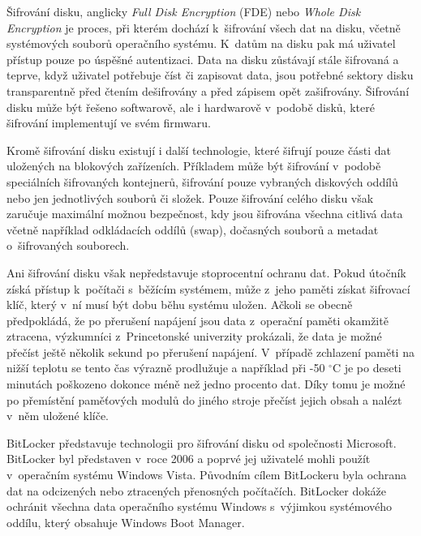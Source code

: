 
\label{sec:fde}

Šifrování disku, anglicky \emph{Full Disk Encryption} (FDE) nebo \emph{Whole Disk Encryption} je proces, při kterém dochází k~šifrování všech dat na disku, včetně systémových souborů operačního systému. K~datům na disku pak má uživatel přístup pouze po úspěšné autentizaci. Data na disku zůstávají stále šifrovaná a teprve, když uživatel potřebuje číst či zapisovat data, jsou potřebné sektory disku transparentně před čtením dešifrovány a před zápisem opět zašifrovány. Šifrování disku může být řešeno softwarově, ale i hardwarově v~podobě disků, které šifrování implementují ve svém firmwaru.\cite{Scarfone2007}

Kromě šifrování disku existují i další technologie, které šifrují pouze části dat ulo\-že\-ných na blokových zařízeních. Příkladem může být šifrování v~podobě speciálních šifrovaných kontejnerů, šifrování pouze vybraných diskových oddílů nebo jen je\-dno\-tli\-vých souborů či složek. Pouze šifrování celého disku však zaručuje maximální možnou bez\-peč\-nost, kdy jsou šifrována všechna citlivá data včetně například odkládacích oddílů (swap), dočasných souborů a metadat o~ši\-fro\-va\-ných souborech.\cite{Scarfone2007}

Ani šifrování disku však nepředstavuje stoprocentní ochranu dat. Pokud útočník získá přístup k~počítači s~běžícím systémem, může z~jeho paměti získat šifrovací klíč, který v~ní musí být dobu běhu systému uložen. Ačkoli se obecně předpokládá, že po přerušení napájení jsou data z~operační paměti okamžitě ztracena, výzkumníci z~Princetonské univerzity prokázali, že data je možné přečíst ještě několik sekund po přerušení napájení. V~případě zchlazení paměti na nižší teplotu se tento čas výrazně prodlužuje a například při -50 $^{\circ}$C je po deseti minutách poškozeno dokonce méně než jedno procento dat. Díky tomu je možné po přemístění paměťových modulů do jiného stroje přečíst jejich obsah a nalézt v~něm uložené klíče.\cite{Halderman20090501}


BitLocker představuje technologii pro šifrování disku od společnosti Microsoft. BitLocker byl představen v~roce 2006 a poprvé jej uživatelé mohli použít v~ope\-rač\-ním systému Windows Vista. Původním cílem BitLockeru byla ochrana dat na odcizených nebo ztracených přenosných počítačích.\cite{Ferguson2006} BitLocker dokáže ochránit všechna data ope\-rač\-ní\-ho systému Windows s~výjimkou systémového oddílu, který obsahuje Windows Boot Manager.\cite{Hall20191}

